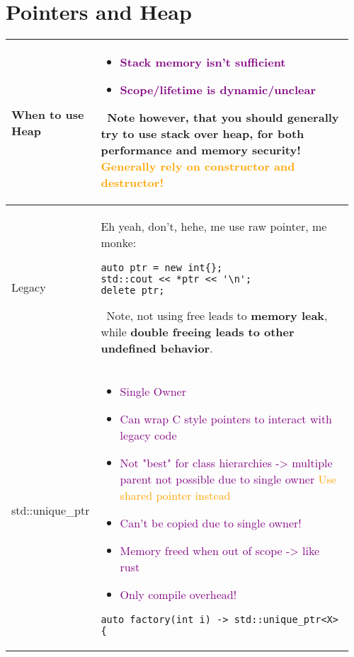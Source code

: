 \documentclass[main.tex,fontsize=8pt,paper=a4,paper=portrait,DIV=calc]{scrartcl}
\begin{document}
\begin{table}[ht!]
\section{Pointers and Heap}
\begin{tabular}{|m{0.2\linewidth}|m{0.755\linewidth}|}
\hline
When to use Heap & 
\vspace{2mm}
\begin{itemize}
\item \textcolor{purple}{Stack memory isn't sufficient}
\item \textcolor{purple}{Scope/lifetime is dynamic/unclear}
\end{itemize} 
\, \newline
Note however, that you should generally try to use stack over heap, for both \textbf{performance and memory security!}\newline
\textcolor{orange}{Generally rely on constructor and destructor!}\\
\hline
Legacy & 
Eh yeah, don't, hehe, me use raw pointer, me monke:\newline
\begin{lstlisting}
auto ptr = new int{};
std::cout << *ptr << '\n';
delete ptr;
\end{lstlisting} 
\, \newline
Note, not using free leads to \textbf{memory leak}, while \textbf{double freeing leads to other undefined behavior}.\\
\hline
std::unique\_ptr & 
\vspace{2mm}
\begin{itemize}
\item \textcolor{purple}{Single Owner}
\item \textcolor{purple}{Can wrap C style pointers to interact with legacy code}
\item \textcolor{purple}{Not "best" for class hierarchies -> multiple parent not possible due to single owner}\newline
  \textcolor{orange}{Use shared pointer instead}
\item \textcolor{purple}{Can't be copied due to single owner!}
\item \textcolor{purple}{Memory freed when out of scope -> like rust}
\item \textcolor{purple}{Only compile overhead!}
\end{itemize} 
\begin{lstlisting}
auto factory(int i) -> std::unique_ptr<X> {

\end{lstlisting}
\end{tabular}
\end{table}
\end{document}
